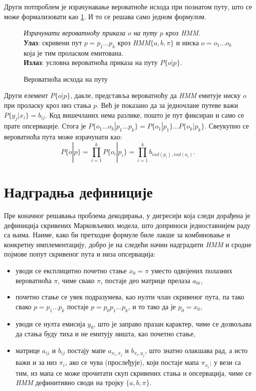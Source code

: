 \documentclass[12pt,oneside]{memoir}
\newenvironment{problem}[1][!ht]
{\renewcommand{\algorithmcfname}{Проблем}
\begin{figure}[!ht]
\centering
  \begin{minipage}{.94\linewidth}
	\begin{algorithm}[#1]%
  }{\end{algorithm}
  \end{minipage}
\end{figure}}
\begin{document}
\begin{CJK}{UTF8}{ipxm}
Други потпроблем је израчунавање вероватноће исхода при познатом путу, што се може формализовати као \ref{prob:ishod}. И то се решава само једном формулом.

\begin{problem}[H]
  \SetAlgoLined
  \textit{Израчунати вероватноћу приказа $o$ на путу $p$ кроз \textit{HMM}.}\\
  \textbf{Улаз}: скривени пут $p = p_1...p_k$ кроз \textit{HMM}$\{a, b, \pi\}$ и ниска $o = o_1...o_k$ која је тим проласком емитована.\\
  \textbf{Излаз}: условна вероватноћа приказа на путу $P\{o | p\}$.
  \caption{Вероватноћа исхода на путу\cite{ba10b}}
  \label{prob:ishod}
\end{problem}

Други елемент $P\{o | p\}$, дакле, представља вероватноћу да \textit{HMM} емитује ниску $o$ при проласку кроз низ стања $p$. Већ је показано да за једночлане путеве важи $P\{y_j | x_i\} = b_{ij}$. Код вишечланих нема разлике, пошто је пут фиксиран и само се прате опсервације. Стога је $P\{o_1...o_k | p_1...p_k\} = P\{o_1 | p_1\}...P\{o_k | p_k\}$. Свеукупно се вероватноћа пута може израчунати као: $$P\{o | p\} = \prod_{i=1}^k P\{o_i | p_i\} = \prod_{i=1}^k b_{ind(p_i), ind(o_i)}.$$

\section{Надградња дефиниције}
Пре коначног решавања проблема декодирања, у дигресији која следи дорађена је дефиниција скривених Марковљевих модела, што доприноси једноставнијем раду са њима. Наиме, како би претходне формуле биле лакше за комбиновање и конкретну имплементацију, добро је на следећи начин надградити \textit{HMM} и сродне појмове попут скривеног пута и низа опсервација:
\begin{itemize}
  \item уводи се експлицитно почетно стање $x_0 = \pi$ уместо одвојених полазних вероватноћа $\pi$, чиме свако $\pi_i$ постаје део матрице прелаза $a_{0i}$,
  \item почетно стање се увек подразумева, као нулти члан скривеног пута, па тако свако $p = p_1...p_k$ постаје $p = p_0p_1...p_k$, и то тако да је $p_0 = x_0$,
  \item уводи се нулта емисија $y_0$, што је заправо празан карактер, чиме се дозвољава да стања буду тиха и не емитују ништа, као почетно стање,
  \item матрице $a_{ij}$ и $b_{ij}$ постају мапе $a_{x_i, x_j}$ и $b_{x_i, y_j}$, што знатно олакшава рад, а исто важи и за низ $\pi_i$, ако се чува (прослеђује), који постаје мапа $\pi_{x_i}$; у вези са тим, из мапа се може прочитати скуп скривених стања и опсервација, чиме се \textit{HMM} дефинитивно своди на тројку $\{a, b, \pi\}$.
\end{itemize}


\end{CJK}
\end{document}
